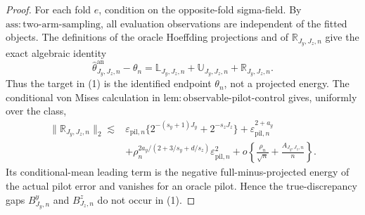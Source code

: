 \documentclass{article}
\begin{document}
\begin{proof}
For each fold \(e\), condition on the opposite-fold sigma-field.  By \(\mathrm{ass{:}two\text{-}arm\text{-}sampling}\), all evaluation observations are independent of the fitted objects.  The definitions of the oracle Hoeffding projections and of \(\mathbb R_{J_y,J_z,n}\) give the exact algebraic identity
\[
\widehat\theta^{\mathrm{an}}_{J_y,J_z,n}-\theta_n
=\mathbb L_{J_y,J_z,n}+\mathbb U_{J_y,J_z,n}+\mathbb R_{J_y,J_z,n}. \tag{1}
\]
Thus the target in (1) is the identified endpoint \(\theta_n\), not a projected energy.  The conditional von Mises calculation in \(\mathrm{lem{:}observable\text{-}pilot\text{-}control}\) gives, uniformly over the class,
\begin{equation}
\begin{split}
\|\mathbb R_{J_y,J_z,n}\|_2\lesssim{}&
\varepsilon_{\mathrm{pil},n}\{2^{-(s_y+1)J_y}+2^{-s_zJ_z}\}
+\varepsilon_{\mathrm{pil},n}^{2+a_y}\\
&+\rho_n^{2a_y/(2+3/s_y+d/s_z)}\varepsilon_{\mathrm{pil},n}^{2}
+o\!\left\{\frac{\rho_n}{\sqrt n}+\frac{A_{J_y,J_z,n}}n\right\}.
\end{split}
\tag{2}\end{equation}
Its conditional-mean leading term is the negative full-minus-projected energy of the actual pilot error and vanishes for an oracle pilot.  Hence the true-discrepancy gaps \(B^y_{J_y,n}\) and \(B^z_{J_z,n}\) do not occur in (1).


\end{proof}
\end{document}
